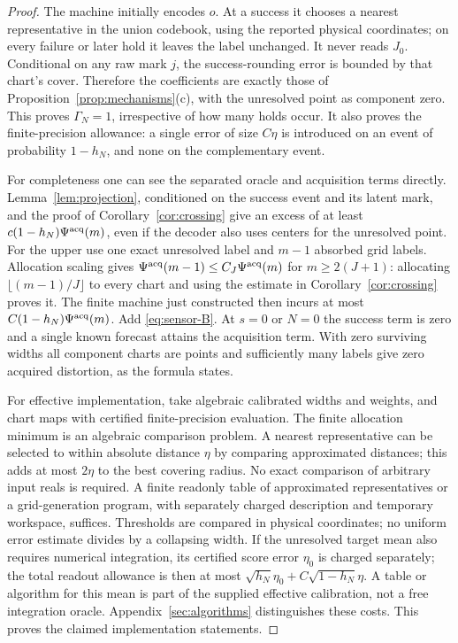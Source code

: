 \begin{proof}
The machine initially encodes $o$. At a success it chooses a nearest representative in the union codebook, using the reported physical coordinates; on every failure or later hold it leaves the label unchanged. It never reads $J_0$. Conditional on any raw mark $j$, the success-rounding error is bounded by that chart's cover. Therefore the coefficients are exactly those of Proposition~\ref{prop:mechanisms}(c), with the unresolved point as component zero. This proves $\Gamma_N=1$, irrespective of how many holds occur. It also proves the finite-precision allowance: a single error of size $C\eta$ is introduced on an event of probability $1-h_N$, and none on the complementary event.

For completeness one can see the separated oracle and acquisition terms directly. Lemma~\ref{lem:projection}, conditioned on the success event and its latent mark, and the proof of Corollary~\ref{cor:crossing} give an excess of at least $c(1-h_N)\Psi^{\rm acq}(m)$, even if the decoder also uses centers for the unresolved point. For the upper use one exact unresolved label and $m-1$ absorbed grid labels. Allocation scaling gives
$\Psi^{\rm acq}(m-1)\le C_J\Psi^{\rm acq}(m)$ for $m\ge2(J+1)$: allocating $\lfloor(m-1)/J\rfloor$ to every chart and using the estimate in Corollary~\ref{cor:crossing} proves it. The finite machine just constructed then incurs at most $C(1-h_N)\Psi^{\rm acq}(m)$. Add \eqref{eq:sensor-B}. At $s=0$ or $N=0$ the success term is zero and a single known forecast attains the acquisition term. With zero surviving widths all component charts are points and sufficiently many labels give zero acquired distortion, as the formula states.

For effective implementation, take algebraic calibrated widths and weights, and chart maps with certified finite-precision evaluation. The finite allocation minimum is an algebraic comparison problem. A nearest representative can be selected to within absolute distance $\eta$ by comparing approximated distances; this adds at most $2\eta$ to the best covering radius. No exact comparison of arbitrary input reals is required. A finite readonly table of approximated representatives or a grid-generation program, with separately charged description and temporary workspace, suffices. Thresholds are compared in physical coordinates; no uniform error estimate divides by a collapsing width. If the unresolved target mean also requires numerical integration, its certified score error $\eta_0$ is charged separately; the total readout allowance is then at most $\sqrt{h_N}\eta_0+C\sqrt{1-h_N}\eta$. A table or algorithm for this mean is part of the supplied effective calibration, not a free integration oracle. Appendix~\ref{sec:algorithms} distinguishes these costs. This proves the claimed implementation statements.
\end{proof}

